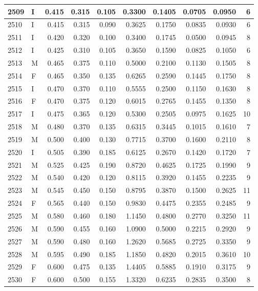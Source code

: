 \documentclass[9pt,twocolumn,twoside,]{pnas-new}
\begin{document}
\begin{tabular}{l|l|r|r|r|r|r|r|r|r}
\hline
2509 & I & 0.415 & 0.315 & 0.105 & 0.3300 & 0.1405 & 0.0705 & 0.0950 & 6\\
\hline
2510 & I & 0.415 & 0.315 & 0.090 & 0.3625 & 0.1750 & 0.0835 & 0.0930 & 6\\
\hline
2511 & I & 0.420 & 0.320 & 0.100 & 0.3400 & 0.1745 & 0.0500 & 0.0945 & 8\\
\hline
2512 & I & 0.425 & 0.310 & 0.105 & 0.3650 & 0.1590 & 0.0825 & 0.1050 & 6\\
\hline
2513 & M & 0.465 & 0.375 & 0.110 & 0.5000 & 0.2100 & 0.1130 & 0.1505 & 8\\
\hline
2514 & F & 0.465 & 0.350 & 0.135 & 0.6265 & 0.2590 & 0.1445 & 0.1750 & 8\\
\hline
2515 & I & 0.470 & 0.370 & 0.110 & 0.5555 & 0.2500 & 0.1150 & 0.1630 & 8\\
\hline
2516 & F & 0.470 & 0.375 & 0.120 & 0.6015 & 0.2765 & 0.1455 & 0.1350 & 8\\
\hline
2517 & I & 0.475 & 0.365 & 0.120 & 0.5300 & 0.2505 & 0.0975 & 0.1625 & 10\\
\hline
2518 & M & 0.480 & 0.370 & 0.135 & 0.6315 & 0.3445 & 0.1015 & 0.1610 & 7\\
\hline
2519 & M & 0.500 & 0.400 & 0.130 & 0.7715 & 0.3700 & 0.1600 & 0.2110 & 8\\
\hline
2520 & I & 0.505 & 0.390 & 0.185 & 0.6125 & 0.2670 & 0.1420 & 0.1720 & 7\\
\hline
2521 & M & 0.525 & 0.425 & 0.190 & 0.8720 & 0.4625 & 0.1725 & 0.1990 & 9\\
\hline
2522 & M & 0.540 & 0.420 & 0.120 & 0.8115 & 0.3920 & 0.1455 & 0.2235 & 9\\
\hline
2523 & M & 0.545 & 0.450 & 0.150 & 0.8795 & 0.3870 & 0.1500 & 0.2625 & 11\\
\hline
2524 & F & 0.565 & 0.440 & 0.150 & 0.9830 & 0.4475 & 0.2355 & 0.2485 & 9\\
\hline
2525 & M & 0.580 & 0.460 & 0.180 & 1.1450 & 0.4800 & 0.2770 & 0.3250 & 11\\
\hline
2526 & M & 0.590 & 0.455 & 0.160 & 1.0900 & 0.5000 & 0.2215 & 0.2920 & 9\\
\hline
2527 & M & 0.590 & 0.480 & 0.160 & 1.2620 & 0.5685 & 0.2725 & 0.3350 & 9\\
\hline
2528 & M & 0.595 & 0.490 & 0.185 & 1.1850 & 0.4820 & 0.2015 & 0.3610 & 10\\
\hline
2529 & F & 0.600 & 0.475 & 0.135 & 1.4405 & 0.5885 & 0.1910 & 0.3175 & 9\\
\hline
2530 & F & 0.600 & 0.500 & 0.155 & 1.3320 & 0.6235 & 0.2835 & 0.3500 & 8\\

\end{tabular}
\end{document}
